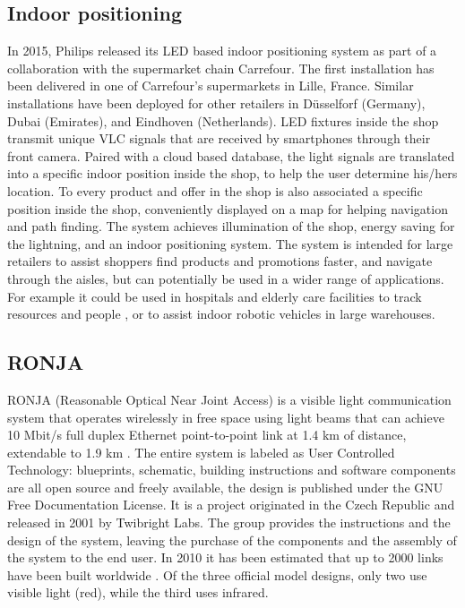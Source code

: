\subsection{Indoor positioning}
In 2015, Philips released its LED based indoor positioning system as part of a collaboration with the supermarket chain Carrefour\cite{philps}.
The first installation has been delivered in one of Carrefour's supermarkets in Lille, France.
Similar installations have been deployed for other retailers in D\"usselforf (Germany), Dubai (Emirates), and Eindhoven (Netherlands).
LED fixtures inside the shop transmit unique VLC signals that are received by smartphones through their front camera.
Paired with a cloud based database, the light signals are translated into a specific indoor position inside the shop, to help the user determine his/hers location.
To every product and offer in the shop is also associated a specific position inside the shop, conveniently displayed on a map for helping navigation and path finding. 
The system achieves illumination of the shop, energy saving for the lightning, and an indoor positioning system.
The system is intended for large retailers to assist shoppers find products and promotions faster, and navigate through the aisles, but can potentially be used in a wider range of applications.
For example it could be used in hospitals and elderly care facilities to track resources and people \cite{arduinobasedindoors}, or to assist indoor robotic vehicles in large warehouses.

\subsection{RONJA}
RONJA (Reasonable Optical Near Joint Access) is a visible light communication system that operates wirelessly in free space using light beams that can achieve 10 Mbit/s full duplex Ethernet point-to-point link at 1.4 km of distance, extendable to 1.9 km \cite{ronja}.
The entire system is labeled as User Controlled Technology: blueprints, schematic, building instructions and software components are all open source and freely available, the design is published under the GNU Free Documentation License.
It is a project originated in the Czech Republic and released in 2001 by Twibright Labs.
The group provides the instructions and the design of the system, leaving the purchase of the components and the assembly of the system to the end user.
In 2010 it has been estimated that up to 2000 links have been built worldwide \cite{ronjaestimation}.
Of the three official model designs, only two use visible light (red), while the third uses infrared.

